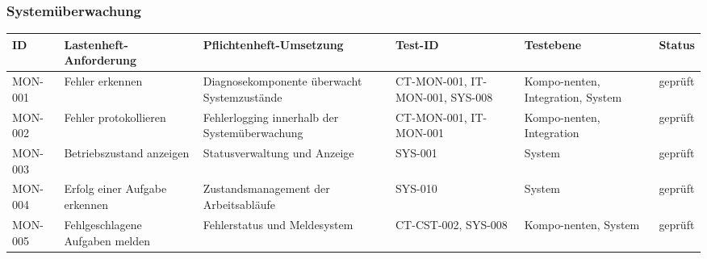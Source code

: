 \subsubsection{Systemüberwachung}\label{systemuxfcberwachung-1}

\begin{longtable}[]{@{}
  >{\raggedright\arraybackslash}p{}
  >{\raggedright\arraybackslash}p{}
  >{\raggedright\arraybackslash}p{}
  >{\raggedright\arraybackslash}p{}
  >{\raggedright\arraybackslash}p{}
  >{\raggedright\arraybackslash}p{}@{}}
\toprule\noalign{}
\begin{minipage}[b]{\linewidth}\raggedright
ID
\end{minipage} & \begin{minipage}[b]{\linewidth}\raggedright
Lastenheft-Anforderung
\end{minipage} & \begin{minipage}[b]{\linewidth}\raggedright
Pflichtenheft-Umsetzung
\end{minipage} & \begin{minipage}[b]{\linewidth}\raggedright
Test-ID
\end{minipage} & \begin{minipage}[b]{\linewidth}\raggedright
Testebene
\end{minipage} & \begin{minipage}[b]{\linewidth}\raggedright
Status
\end{minipage} \\
\midrule\noalign{}
\endhead
\bottomrule\noalign{}
\endlastfoot
MON-001 & Fehler erkennen & Diagnosekomponente überwacht Systemzustände
& CT-MON-001, IT-MON-001, SYS-008 & Kompo-nenten, Integration, System &
geprüft \\
MON-002 & Fehler protokollieren & Fehlerlogging innerhalb der
Systemüberwachung & CT-MON-001, IT-MON-001 & Kompo-nenten, Integration &
geprüft \\
MON-003 & Betriebszustand anzeigen & Statusverwaltung und Anzeige &
SYS-001 & System & geprüft \\
MON-004 & Erfolg einer Aufgabe erkennen & Zustandsmanagement der
Arbeitsabläufe & SYS-010 & System & geprüft \\
MON-005 & Fehlgeschlagene Aufgaben melden & Fehlerstatus und Meldesystem
& CT-CST-002, SYS-008 & Kompo-nenten, System & geprüft \\
\end{longtable}

